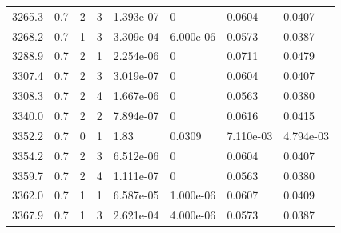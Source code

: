 \documentclass[preview]{standalone}
\begin{document}
{{{{{{{{{\begin{tabular}{L{1.2cm}C{1.2cm} C{0.3cm}C{0.5cm} C{1.4cm}C{1.4cm} C{1.4cm}C{1.4cm}}
  3265.3  &   0.7  & 2     &  3 &  1.393e-07  & 0  & 0.0604 &  0.0407   \\ 
  3268.2  &   0.7  & 1     &  3 &  3.309e-04  & 6.000e-06  & 0.0573 &  0.0387   \\ 
  3288.9  &   0.7  & 2     &  1 &  2.254e-06  & 0  & 0.0711 &  0.0479   \\ 
  3307.4  &   0.7  & 2     &  3 &  3.019e-07  & 0  & 0.0604 &  0.0407   \\ 
  3308.3  &   0.7  & 2     &  4 &  1.667e-06  & 0  & 0.0563 &  0.0380   \\ 
  3340.0  &   0.7  & 2     &  2 &  7.894e-07  & 0  & 0.0616 &  0.0415   \\ 
  3352.2  &   0.7  & 0     &  1 &  1.83  & 0.0309  & 7.110e-03 &  4.794e-03   \\ 
  3354.2  &   0.7  & 2     &  3 &  6.512e-06  & 0  & 0.0604 &  0.0407   \\ 
  3359.7  &   0.7  & 2     &  4 &  1.111e-07  & 0  & 0.0563 &  0.0380   \\ 
  3362.0  &   0.7  & 1     &  1 &  6.587e-05  & 1.000e-06  & 0.0607 &  0.0409   \\ 
  3367.9  &   0.7  & 1     &  3 &  2.621e-04  & 4.000e-06  & 0.0573 &  0.0387   \\ 
\hline 
\end{tabular} 

}}}}}}}}}
\end{document}
